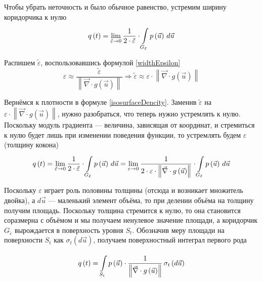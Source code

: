 Чтобы убрать неточность и было обычное равенство,
устремим ширину коридорчика к нулю
\begin{equation}\label{isosurfaceDencity}
    q\left( t \right)
        = \lim_{\tilde{\varepsilon} \to 0} \frac{1}{2 \cdot \tilde{\varepsilon}}
            \cdot \integrall{G_{\tilde{\varepsilon}}}{d\vec{u}}{\pdf{\vec{u}}}
\end{equation}

Распишем $\tilde{\varepsilon}$, воспользовавшись формулой \eqref{widthEpsilon}
$$\varepsilon
    \approx \frac{\tilde{\varepsilon}}
        {\left\| \vec{\nabla} \cdot {g\left( \vec{u} \right)} \right\|}
    \Rightarrow
        \tilde{\varepsilon} \approx \varepsilon
            \cdot \left\| \vec{\nabla} \cdot g\left( \vec{u} \right) \right\|$$

Вернёмся к плотности в формуле \eqref{isosurfaceDencity}.
Заменив $\tilde{\varepsilon}$ на $\varepsilon
\cdot \left\| \vec{\nabla} \cdot g\left( \vec{u} \right) \right\|$,
нужно разобраться, что теперь нужно устремлять к нулю.
Поскольку модуль градиента --- величина, зависящая от координат,
и стремиться к нулю будет лишь при изменении поведения функции,
то устремлять будем $\varepsilon$ (толщину кокона)
$$q\left( t \right)
        = \lim_{\tilde{\varepsilon} \to 0} \frac{1}{2 \cdot \tilde{\varepsilon}}
            \cdot \integrall{G_{\tilde{\varepsilon}}}{d\vec{u}}{\pdf{\vec{u}}}
        = \lim_{\varepsilon \to 0} \frac{1}{2 \cdot \varepsilon
            \cdot \left\| \vec{\nabla} \cdot g\left( \vec{u} \right) \right\|}
            \cdot \integrall{G_{\tilde{\varepsilon}}}{d\vec{u}}{\pdf{\vec{u}}}$$

Поскольку $\varepsilon$ играет роль половины толщины
(отсюда и возникает множитель двойка),
а $d\vec{u}$ --- маленький элемент объёма,
то при делении объёма на толщину получим площадь.
Поскольку толщина стремится к нулю,
то она становится соразмерна с объёмом и мы получаем ненулевое значение площади,
а коридорчик $G_{\tilde{\varepsilon}}$ вырождается в поверхность уровня $S_t$.
Обозначив меру площади на поверхности $S_t$ как
$\sigma_{t}\left( d\vec{u} \right)$,
получаем поверхностный интеграл первого рода

\begin{equation}\label{formula:conditionDencity}
    q\left( t \right)
    = \integrall{S_t}{\sigma_{t}\left(d\vec{u} \right)}{
        \pdf{\vec{u}} \cdot \frac{1}
            {\left\| \vec{\nabla} \cdot g\left( \vec{u} \right) \right\|}}
\end{equation}

